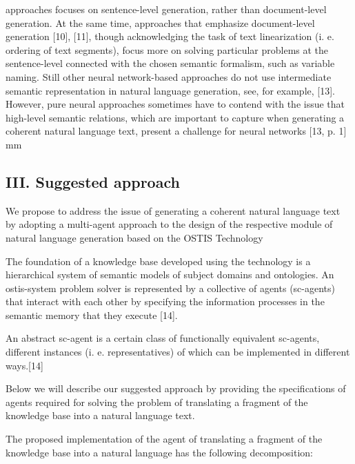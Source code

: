 \documentclass[9pt, a4paper]{article}
\begin{document}
\hspace{4mm}
\begin{minipage}{0.46\textwidth}
\vspace{9mm}
approaches focuses on sentence-level generation, rather
than document-level generation. At the same time, approaches that emphasize document-level generation [10],
[11], though acknowledging the task of text linearization
(i. e. ordering of text segments), focus more on solving
particular problems at the sentence-level connected with
the chosen semantic formalism, such as variable naming.
Still other neural network-based approaches do not use
intermediate semantic representation in natural language
generation, see, for example, [13]. However, pure neural
approaches sometimes have to contend with the issue
that high-level semantic relations, which are important
to capture when generating a coherent natural language
text, present a challenge for neural networks [13, p. 1]
 mm
\begin{center}
  \section*{\small{III. Suggested approach}}
\end{center}


We propose to address the issue of generating a
coherent natural language text by adopting a multi-agent
approach to the design of the respective module of natural
language generation based on the OSTIS Technology


The foundation of a knowledge base developed using
the technology is a hierarchical system of semantic models of subject domains and ontologies. An ostis-system
problem solver is represented by a collective of agents
(sc-agents) that interact with each other by specifying the
information processes in the semantic memory that they
execute [14].


An abstract sc-agent is a certain class of functionally equivalent sc-agents, different instances (i. e. representatives) of which can be implemented in different
ways.[14]


Below we will describe our suggested approach by
providing the specifications of agents required for solving
the problem of translating a fragment of the knowledge
base into a natural language text.



The proposed implementation of the agent of translating a fragment of the knowledge base into a natural
language has the following decomposition:


\end{minipage}
\end{document}
